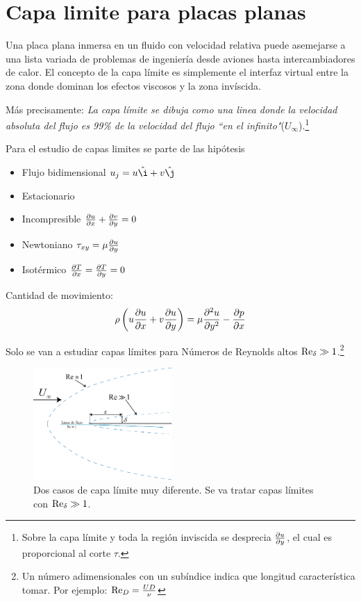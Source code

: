 \newcommand{\dstar}{\delta^{*}}
\section{Capa limite para placas planas}
Una placa plana inmersa en un fluido con velocidad relativa puede asemejarse a una lista variada de problemas de ingeniería desde aviones hasta intercambiadores de calor. El concepto de la capa límite es simplemente el interfaz virtual entre la zona donde dominan los efectos viscosos y la zona invíscida. 

Más precisamente:\textit{ La capa límite se dibuja como una linea donde la velocidad absoluta del flujo es 99\% de la velocidad del flujo ``en el infinito"{}}($U_\infty$).\footnote{Sobre la capa límite y toda la región inviscida se desprecia $\frac{\partial u}{\partial y}$, el cual es proporcional al corte $\tau$.}

 Para el estudio de capas limites se parte de las hipótesis 
 
 \begin{itemize}
 	\item Flujo bidimensional $u_j = u \hat{\i} + v \hat{\j}$
 	\item Estacionario
 	\item Incompresible $ \frac{\partial u}{\partial x}+\frac{\partial v}{\partial y}=0$
 	\item Newtoniano  $\tau_{xy}=\mu \frac{\partial u}{\partial y}$
 	\item Isotérmico $\frac{\partial T}{\partial x}=\frac{\partial T}{\partial y}=0$
 \end{itemize}

 Cantidad de movimiento:
\[
\rho\left(u\frac{\partial u}{\partial x}+v\frac{\partial u}{\partial y}\right)=\mu \frac{\partial^2 u}{\partial y ^2}-\frac{\partial p}{\partial x}
\]

Solo se van a estudiar capas límites para Números de Reynolds altos $\textrm{Re}_\delta\gg 1$.\footnote{Un número adimensionales con un subíndice indica que longitud característica tomar. Por ejemplo: $\textrm{Re}_D= \frac{UD}{\nu}$}

\begin{figure}%
    \centering
    \includegraphics[width=0.47\textwidth]{fig/BL1.eps}
    \caption{Dos casos de capa límite muy diferente. Se va tratar capas límites con $\textrm{Re}_\delta \gg1$.}
    \label{fig:BLintro}
\end{figure}
